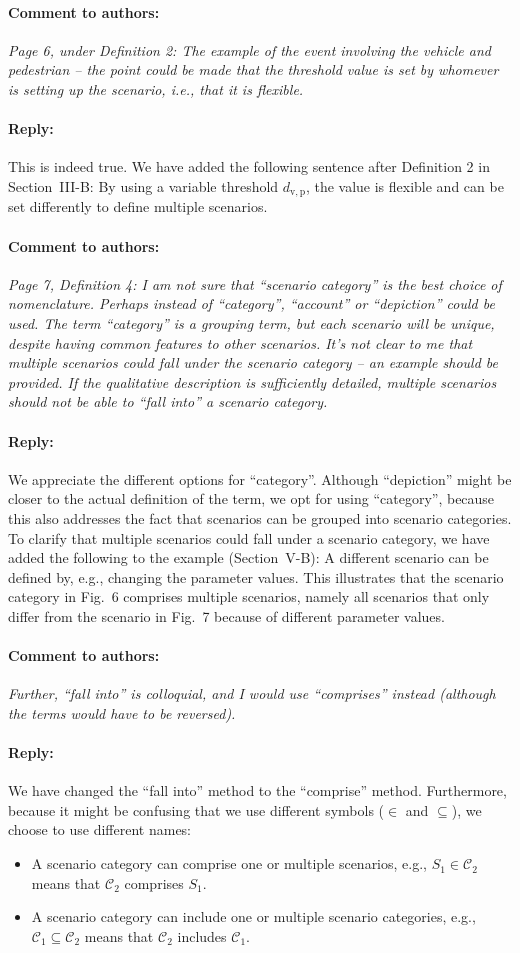 \documentclass[10pt,final,a4paper,oneside,onecolumn]{article}
\newcommand{\toauthor}{\paragraph*{Comment to authors:} \itshape}
\newcommand{\fromauthor}{\paragraph*{Reply:} \normalfont}
\newcommand{\cstart}{\cbstart\color{red}}
\newcommand{\cend}{\cbend\color{black}}
\newcommand{\distancecondition}{d_{\mathrm{v,p}}}
\newcommand{\scenario}{S}
\newcommand{\scenarioa}{\scenario_{1}}
\newcommand{\scenariofallsinto}{\in}
\newcommand{\scenariocategory}{\mathcal{C}}
\newcommand{\scenariocategorya}{\scenariocategory_{1}}
\newcommand{\scenariocategoryb}{\scenariocategory_{2}}
\newcommand{\scenariocategoryfallsinto}{\subseteq}
\begin{document}
\toauthor Page 6, under Definition 2: The example of the event involving the vehicle and pedestrian -- the point could be made that the threshold value is set by whomever is setting up the scenario, i.e., that it is flexible.

\fromauthor This is indeed true. We have added the following sentence after Definition 2 in Section~III-B: \cstart By using a variable threshold $\distancecondition$, the value is flexible and can be set differently to define multiple scenarios.\cend



\toauthor Page 7, Definition 4: I am not sure that ``scenario category'' is the best choice of nomenclature. Perhaps instead of ``category'', ``account'' or ``depiction'' could be used. The term ``category'' is a grouping term, but each scenario will be unique, despite having common features to other scenarios. It's not clear to me that multiple scenarios could fall under the scenario category -- an example should be provided. If the qualitative description is sufficiently detailed, multiple scenarios should not be able to ``fall into'' a scenario category.

\fromauthor We appreciate the different options for ``category''. Although ``depiction'' might be closer to the actual definition of the term, we opt for using ``category'', because this also addresses the fact that scenarios can be grouped into scenario categories. To clarify that multiple scenarios could fall under a scenario category, we have added the following to the example (Section~V-B): \cstart A different scenario can be defined by, e.g., changing the parameter values. This illustrates that the scenario category in Fig.~6 comprises multiple scenarios, namely all scenarios that only differ from the scenario in Fig.~7 because of different parameter values.\cend

\toauthor Further, ``fall into'' is colloquial, and I would use ``comprises'' instead (although the terms would have to be reversed).

\fromauthor We have changed the ``fall into'' method to the ``\cstart comprise\cend'' method. Furthermore, because it might be confusing that we use different symbols ($\scenariofallsinto$ and $\scenariocategoryfallsinto$), we choose to use different names:
\begin{itemize}
	\item A scenario category can \cstart comprise \cend one or multiple scenarios, e.g., $\scenarioa \scenariofallsinto \scenariocategoryb$ means that $\scenariocategoryb$ \cstart comprises \cend $\scenarioa$.
	\item A scenario category can \cstart include \cend one or multiple scenario categories, e.g., $\scenariocategorya \scenariocategoryfallsinto \scenariocategoryb$ means that $\scenariocategoryb$ \cstart includes \cend $\scenariocategorya$.
\end{itemize}
\end{document}
